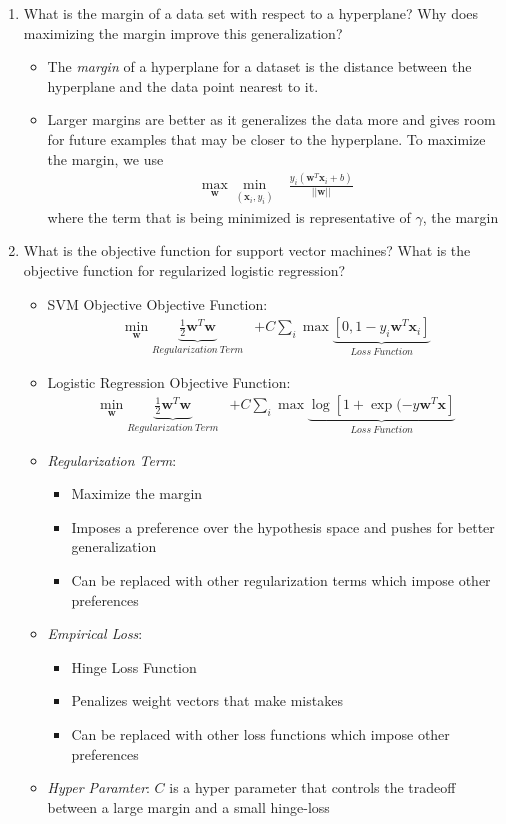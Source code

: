 \documentclass{article}
\newcommand{\Norm}[1]{\left|\left| #1\right|\right|}
\newcommand{\bwx}{\mathbf{w}^{T}\mathbf{x}}
\begin{document}
\begin{enumerate}
\item What is the margin of a data set with respect to a hyperplane? Why does maximizing the margin improve this generalization?

\begin{itemize}
\item The {\em margin} of a hyperplane for a dataset is the distance between the hyperplane and the data point nearest to it. 
\item Larger margins are better as it generalizes the data more and gives room for future examples that may be closer to the hyperplane. To maximize the margin, we use
\begin{align}
\max_{\mathbf{w}}\min_{(\mathbf{x}_{i},y_{i})}&\frac{y_{i}(\mathbf{w}^{T}\mathbf{x}_{i}+b)}{\Norm{\mathbf{w}}}
\end{align}
where the term that is being minimized is representative of $\gamma$, the margin
\end{itemize}


\item What is the objective function for support vector machines? What is the objective function for regularized logistic regression?

\begin{itemize}
\item SVM Objective Objective Function:
\begin{align}
\min_{\mathbf{w}}\underbrace{\frac{1}{2}\mathbf{w}^{T}\mathbf{w}}_{Regularization\ Term}&+C\sum_{i}\max\underbrace{\left[0,1-y_{i}\mathbf{w}^{T}\mathbf{x}_{i}\right]}_{Loss\ Function}
\end{align}
\item Logistic Regression Objective Function:
\begin{align}
\min_{\mathbf{w}}\underbrace{\frac{1}{2}\mathbf{w}^{T}\mathbf{w}}_{Regularization\ Term}&+C\sum_{i}\max\underbrace{\log\left[1+\exp(-y\bwx\right]}_{Loss\ Function}
\end{align}
\item {\em Regularization Term}:
\begin{itemize}
\item Maximize the margin
\item Imposes a preference over the hypothesis space and pushes for better generalization
\item Can be replaced with other regularization terms which impose other preferences
\end{itemize}
\item {\em Empirical Loss}:
\begin{itemize}
\item Hinge Loss Function
\item Penalizes weight vectors that make mistakes
\item Can be replaced with other loss functions which impose other preferences
\end{itemize}
\item {\em Hyper Paramter}: $C$ is a hyper parameter that controls the tradeoff between a large margin and a small hinge-loss
\end{itemize}



\end{enumerate}
\end{document}
